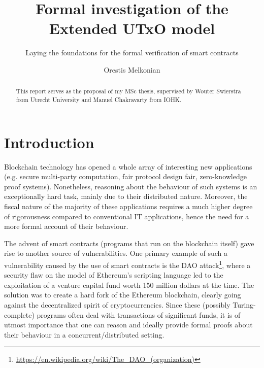 \documentclass[acmsmall,nonacm=true,screen=true]{acmart}
\newcommand\site[1]{\footnote{\url{#1}}}
\begin{document}
\sloppy %

\title{Formal investigation of the Extended UTxO model}
\subtitle{Laying the foundations for the formal verification of smart contracts}

\author{Orestis Melkonian}

\begin{abstract}
This report serves as the proposal of my MSc thesis, supervised by Wouter Swierstra from
Utrecht University and Manuel Chakravarty from IOHK.
\end{abstract}

\maketitle

\section{Introduction}
\label{sec:intro}

Blockchain technology has opened a whole array of interesting new applications
(e.g. secure multi-party computation\cite{mpc}, fair protocol design fair\cite{fair}, zero-knowledge proof systems\cite{zeroproof}).
Nonetheless, reasoning about the behaviour of such systems is an exceptionally hard task, mainly due to their distributed nature.
Moreover, the fiscal nature of the majority of these applications requires a much higher degree of rigorousness compared to
conventional IT applications, hence the need for a more formal account of their behaviour.

The advent of smart contracts (programs that run on the blockchain itself) gave
rise to another source of vulnerabilities.
One primary example of such a vulnerability caused by the use of smart contracts is the
DAO attack\site{https://en.wikipedia.org/wiki/The_DAO_(organization)},
where a security flaw on the model of Ethereum's scripting language led to the exploitation of a venture capital fund
worth 150 million dollars at the time.
The solution was to create a hard fork of the Ethereum blockchain, clearly going against the decentralized spirit
of cryptocurrencies.
Since these (possibly Turing-complete) programs often deal with transactions of significant funds,
it is of utmost importance that one can reason and ideally provide formal proofs about their behaviour
in a concurrent/distributed setting.
\end{document}
